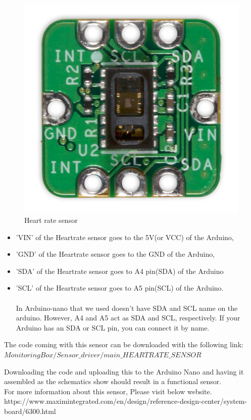 \documentclass{report}
\begin{document}
\begin{figure}[H]
\begin{center}
\includegraphics[scale=0.25]{images/MAXREFDES117Fig00.png}
\caption{Heart rate sensor}
\end{center}
\end{figure}

\begin{itemize}
\item 'VIN' of the Heartrate sensor goes to the 5V(or VCC) of the Arduino, 
\item 'GND' of the Heartrate sensor goes to the GND of the Arduino,
\item 'SDA' of the Heartrate sensor goes to A4 pin(SDA) of the Arduino 
\item 'SCL' of the Heartrate sensor goes to A5 pin(SCL) of the Arduino.\\
\\In Arduino-nano that we used doesn't have SDA and SCL name on the arduino. However, A4 and A5 act as SDA and SCL, respectively. If your Arduino has an SDA or SCL pin, you can connect it by name.
 
\end{itemize}
The code coming with this sensor can be downloaded with the following link: $ MonitoringBox/Sensor\_driver/main\_HEARTRATE\_SENSOR $


Downloading the code and uploading this to the Arduino Nano and having it assembled as the schematics show should result in a functional sensor. \\
For more information about this sensor, Please visit below website.\\
https://www.maximintegrated.com/en/design/reference-design-center/system-board/6300.html
\end{document}
